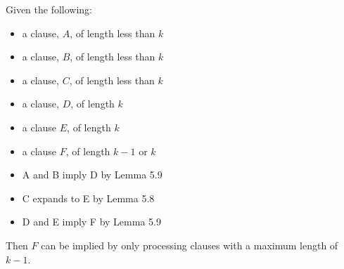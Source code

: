 \documentclass[manuscript]{acmart}
\begin{document}
    \begin{lemma}
        Given the following:
        \begin{itemize}
            \item a clause, $A$, of length less than $k$
            \item a clause, $B$, of length less than $k$
            \item a clause, $C$, of length less than $k$
            \item a clause, $D$, of length $k$
            \item a clause $E$, of length $k$
            \item a clause $F$, of length $k - 1$ or $k$
            \item A and B imply D by Lemma 5.9
            \item C expands to E by Lemma 5.8
            \item D and E imply F by Lemma 5.9
        \end{itemize}
        Then $F$ can be implied by only processing clauses with a maximum length of $k-1$.
    \end{lemma}
\end{document}
